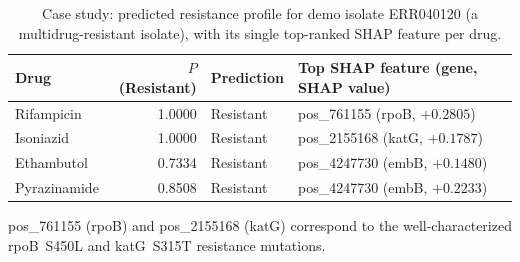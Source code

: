 \begin{table}[t]
\centering
\caption{Case study: predicted resistance profile for demo isolate ERR040120 (a multidrug-resistant isolate), with its single top-ranked SHAP feature per drug.}
\label{tab:casestudy}
\begin{tabular}{lrll}
\toprule
Drug & $P$(Resistant) & Prediction & Top SHAP feature (gene, SHAP value) \\
\midrule
Rifampicin   & 1.0000 & Resistant & pos\_761155 (rpoB, $+0.2805$) \\
Isoniazid    & 1.0000 & Resistant & pos\_2155168 (katG, $+0.1787$) \\
Ethambutol   & 0.7334 & Resistant & pos\_4247730 (embB, $+0.1480$) \\
Pyrazinamide & 0.8508 & Resistant & pos\_4247730 (embB, $+0.2233$) \\
\bottomrule
\end{tabular}

\vspace{4pt}
\footnotesize
pos\_761155 (rpoB) and pos\_2155168 (katG) correspond to the well-characterized rpoB~S450L and katG~S315T resistance mutations.
\end{table}
